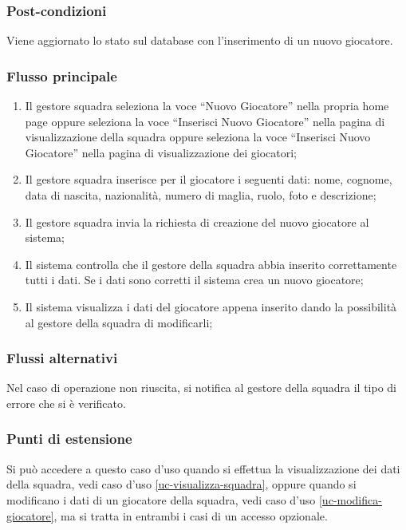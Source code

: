 \subsubsection*{Post-condizioni}
Viene aggiornato lo stato sul database con l'inserimento di un nuovo giocatore.

\subsubsection*{Flusso principale}

\begin{enumerate}
	
	\item
	Il gestore squadra seleziona la voce ``Nuovo Giocatore'' nella propria home page oppure seleziona la voce ``Inserisci Nuovo Giocatore'' nella pagina di visualizzazione della squadra oppure seleziona la voce ``Inserisci Nuovo Giocatore'' nella pagina di visualizzazione dei giocatori;
	
	\item
	Il gestore squadra inserisce per il giocatore i seguenti dati: nome, cognome, data di nascita, nazionalità, numero di maglia, ruolo, foto e descrizione;
	
	\item
	Il gestore squadra invia la richiesta di creazione del nuovo giocatore al sistema;
	
	\item
	Il sistema controlla che il gestore della squadra abbia inserito correttamente tutti i dati. Se i dati sono corretti il sistema crea un nuovo giocatore;
	
	\item
	Il sistema visualizza i dati del giocatore appena inserito dando la possibilità al gestore della squadra di modificarli;
	
\end{enumerate}

\subsubsection*{Flussi alternativi}
Nel caso di operazione non riuscita, si notifica al gestore della squadra il tipo di errore che si è verificato.

\subsubsection*{Punti di estensione}
Si può accedere a questo caso d'uso quando si effettua la visualizzazione dei dati della squadra, vedi caso d'uso \vref{uc-visualizza-squadra}, oppure quando si modificano i dati di un giocatore della squadra, vedi caso d'uso \vref{uc-modifica-giocatore}, ma si tratta in entrambi i casi di un accesso opzionale.


